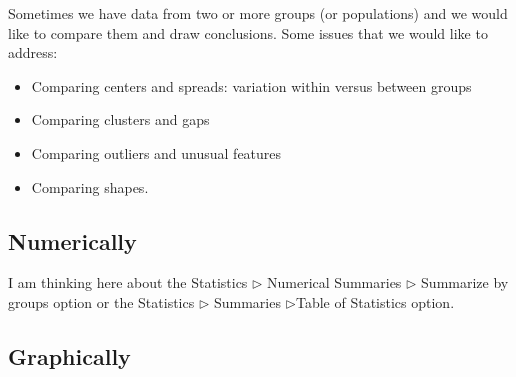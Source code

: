 \documentclass[captions=tableheading]{scrbook}
\begin{document}
\label{sec:Comparing-Data-Sets}

Sometimes we have data from two or more groups (or populations) and we would like to compare them and draw conclusions. Some issues that we would like to address:

\begin{itemize}
\item Comparing centers and spreads: variation within versus between groups
\item Comparing clusters and gaps
\item Comparing outliers and unusual features
\item Comparing shapes.
\end{itemize}
\subsection{Numerically}
\label{sec-2-6-1}


I am thinking here about the \textsf{Statistics} \textsf{\(\triangleright\)} \textsf{Numerical Summaries} \textsf{\(\triangleright\) Summarize by groups} option or the \textsf{Statistics} \textsf{\(\triangleright\)} \textsf{Summaries} \textsf{\(\triangleright\)Table of Statistics} option. 
\subsection{Graphically}
\label{sec-2-6-2}
\end{document}
